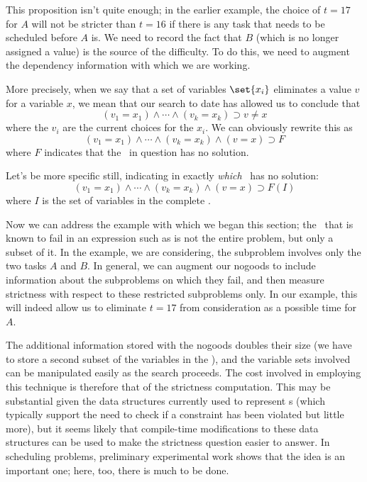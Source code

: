 This proposition isn't quite enough; in the earlier example, the
choice of $t=17$ for $A$ will not be stricter than $t=16$ if there is
any task that needs to be scheduled before $A$ is.  We need to record
the fact that $B$ (which is no longer assigned a value) is the source
of the difficulty.  To do this, we need to augment the dependency
information with which we are working.

More precisely, when we say that a set of variables $\set{x_i}$
eliminates a value $v$ for a variable $x$, we mean that our search to
date has allowed us to conclude that
 \[(v_1=x_1) \wedge \cdots \wedge (v_k=x_k) \supset v\neq x\]
 where the $v_i$ are the current choices for the $x_i$.  We can
obviously rewrite this as
 \begin{equation}
(v_1=x_1) \wedge \cdots \wedge (v_k=x_k) \wedge (v=x) \supset F
 \label{e.fail}
 \end{equation}
 where $F$ indicates that the \csp\ in question has no solution.

Let's be more specific still, indicating in  exactly {\em
which\/} \csp\ has no solution:
 \begin{equation}
(v_1=x_1) \wedge \cdots \wedge (v_k=x_k) \wedge (v=x) \supset F(I)
 \label{e.big-fail}
 \end{equation}
 where $I$ is the set of variables in the complete \csp.

Now we can address the example with which we began this section; the
\csp\ that is known to fail in an expression such as  is
not the entire problem, but only a subset of it.  In the example, we
are considering, the subproblem involves only the two tasks $A$ and
$B$.  In general, we can augment our nogoods to include information
about the subproblems on which they fail, and then measure strictness
with respect to these restricted subproblems only.  In our example,
this will indeed allow us to eliminate $t=17$ from consideration as a
possible time for $A$.

The additional information stored with the nogoods doubles their size
(we have to store a second subset of the variables in the \csp), and
the variable sets involved can be manipulated easily as the search
proceeds.  The cost involved in employing this technique is therefore
that of the strictness computation.  This may be substantial given the
data structures currently used to represent \csp s (which typically
support the need to check if a constraint has been violated but little
more), but it seems likely that compile-time modifications to these
data structures can be used to make the strictness question easier to
answer.  In scheduling problems, preliminary experimental work shows
that the idea is an important one; here, too, there is much to be
done.

